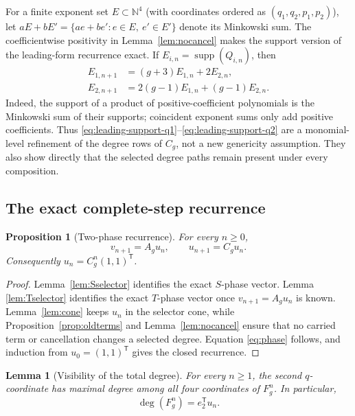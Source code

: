 \documentclass[11pt]{article}
\newtheorem{lemma}[theorem]{Lemma}
\newtheorem{proposition}[theorem]{Proposition}
\theoremstyle{remark}
\numberwithin{equation}{section}
\begin{document}
For a finite exponent set $E\subset\mathbb N^4$ (with coordinates ordered as
$(q_1,q_2,p_1,p_2)$), let
\(aE+bE' =\{ae+be':e\in E,\ e'\in E'\}\) denote its Minkowski sum.
The coefficientwise positivity in Lemma~\ref{lem:nocancel} makes the support
version of the leading-form recurrence exact.  If
\(E_{i,n}=\operatorname{supp}(Q_{i,n})\), then
\begin{align}
 E_{1,n+1}&=(g+3)E_{1,n}+2E_{2,n},\label{eq:leading-support-q1}\\
 E_{2,n+1}&=2(g-1)E_{1,n}+(g-1)E_{2,n}.
 \label{eq:leading-support-q2}
\end{align}
Indeed, the support of a product of positive-coefficient polynomials is the
Minkowski sum of their supports; coincident exponent sums only add positive
coefficients.  Thus \eqref{eq:leading-support-q1}--\eqref{eq:leading-support-q2}
are a monomial-level refinement of the degree rows of $C_g$, not a new
genericity assumption.  They also show directly that the selected degree
paths remain present under every composition.

\subsection{The exact complete-step recurrence}

\begin{proposition}[Two-phase recurrence]\label{prop:recurrence}
For every \(n\geq0\),
\[
 v_{n+1}=A_gu_n,\qquad u_{n+1}=C_gu_n.
\]
Consequently \(u_n=C_g^n(1,1)^{\mathsf T}\).
\end{proposition}

\begin{proof}
Lemma~\ref{lem:Sselector} identifies the exact \(S\)-phase vector.  Lemma
\ref{lem:Tselector} identifies the exact \(T\)-phase vector once
\(v_{n+1}=A_gu_n\) is known.  Lemma~\ref{lem:cone} keeps \(u_n\) in the
selector cone, while Proposition~\ref{prop:oldterms} and
Lemma~\ref{lem:nocancel} ensure that no carried term or cancellation changes a
selected degree.  Equation \eqref{eq:phase} follows, and induction from
\(u_0=(1,1)^{\mathsf T}\) gives the closed recurrence.
\end{proof}

\begin{lemma}[Visibility of the total degree]\label{lem:visibility}
For every \(n\geq1\), the second \(q\)-coordinate has maximal degree among all
four coordinates of \(F_g^n\).  In particular,
\[
 \deg(F_g^n)=e_2^{\mathsf T}u_n.
\]
\end{lemma}
\end{document}
